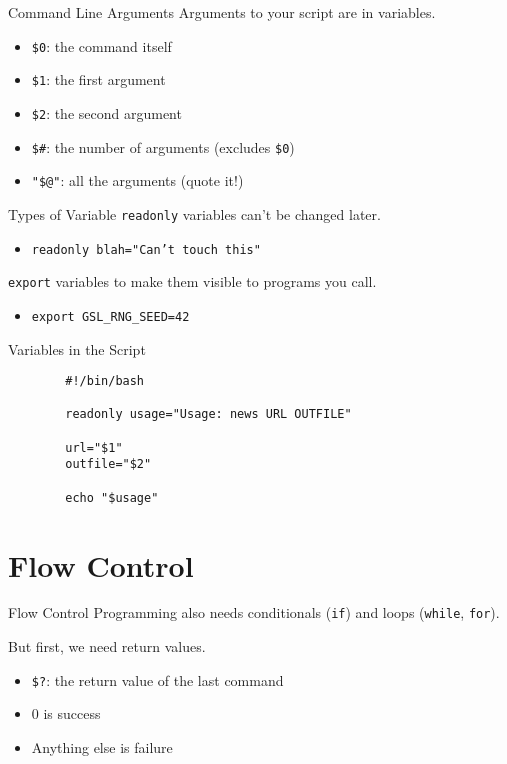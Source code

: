 \documentclass[pdf,usenames,dvipsnames,14pt]{beamer}%
\begin{document}
\begin{frame}{Command Line Arguments}
	Arguments to your script are in variables.
	\begin{itemize}
		\item \texttt{\$0}: the command itself
		\item \texttt{\$1}: the first argument
		\item \texttt{\$2}: the second argument
		\item \texttt{\$\#}: the number of arguments (excludes \texttt{\$0})
		\item \texttt{"\$@"}: all the arguments (quote it!)
	\end{itemize}
\end{frame}

\begin{frame}{Types of Variable}
	\texttt{readonly} variables can't be changed later.
	\begin{itemize}
		\item \texttt{readonly blah="Can't touch this"}
	\end{itemize}
	\texttt{export} variables to make them visible to programs you call.
	\begin{itemize}
		\item \texttt{export GSL\_RNG\_SEED=42}
	\end{itemize}
\end{frame}

\begin{frame}[fragile]{Variables in the Script}
	\begin{verbatim}
		#!/bin/bash
		
		readonly usage="Usage: news URL OUTFILE"
		
		url="$1"
		outfile="$2"
		
		echo "$usage"
	\end{verbatim}
\end{frame}

\section{Flow Control}

\begin{frame}{Flow Control}
	Programming also needs conditionals (\texttt{if}) and loops (\texttt{while}, \texttt{for}).
	
	But first, we need return values.
	\begin{itemize}
		\item \texttt{\$?}: the return value of the last command
		\item 0 is success
		\item Anything else is failure
	\end{itemize}
\end{frame}
\end{document}
